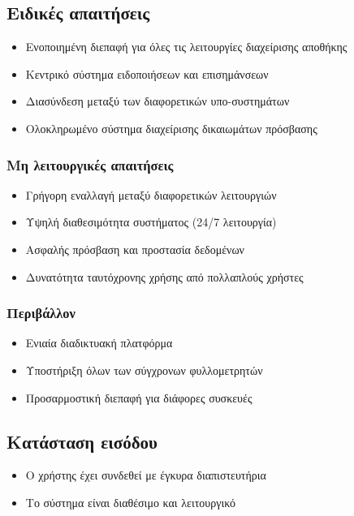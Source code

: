 \documentclass[12pt,a4paper,twoside]{book}
\begin{document}
\subsection{Ειδικές απαιτήσεις}
\begin{itemize}
  \item Ενοποιημένη διεπαφή για όλες τις λειτουργίες διαχείρισης αποθήκης
  \item Κεντρικό σύστημα ειδοποιήσεων και επισημάνσεων
  \item Διασύνδεση μεταξύ των διαφορετικών υπο-συστημάτων
  \item Ολοκληρωμένο σύστημα διαχείρισης δικαιωμάτων πρόσβασης
\end{itemize}

\subsubsection{Μη λειτουργικές απαιτήσεις}
\begin{itemize}
  \item Γρήγορη εναλλαγή μεταξύ διαφορετικών λειτουργιών
  \item Υψηλή διαθεσιμότητα συστήματος (24/7 λειτουργία)
  \item Ασφαλής πρόσβαση και προστασία δεδομένων
  \item Δυνατότητα ταυτόχρονης χρήσης από πολλαπλούς χρήστες
\end{itemize}

\subsubsection{Περιβάλλον}
\begin{itemize}
  \item Ενιαία διαδικτυακή πλατφόρμα
  \item Υποστήριξη όλων των σύγχρονων φυλλομετρητών
  \item Προσαρμοστική διεπαφή για διάφορες συσκευές
\end{itemize}

\subsection{Κατάσταση εισόδου}
\begin{itemize}
  \item Ο χρήστης έχει συνδεθεί με έγκυρα διαπιστευτήρια
  \item Το σύστημα είναι διαθέσιμο και λειτουργικό
\end{itemize}
\end{document}
